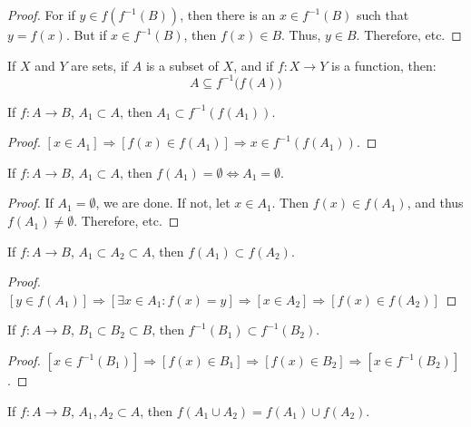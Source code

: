 \documentclass[crop=false,class=book,oneside]{standalone}
\begin{document}
        \begin{proof}
            For if $y\in{f(f^{-1}(B))}$, then there is an
            $x\in{f^{-1}(B)}$ such that $y=f(x)$. But if
            $x\in{f^{-1}(B)}$, then $f(x)\in{B}$. Thus,
            $y\in{B}$. Therefore, etc.
        \end{proof}
        \begin{theorem}
            If $X$ and $Y$ are sets, if $A$ is a subset of $X$,
            and if $f:X\rightarrow{Y}$ is a function, then:
            \begin{equation}
                A\subseteq{f^{-1}}\big(f(A)\big)
            \end{equation}
        \end{theorem}
        \begin{theorem}
        If $f:A\rightarrow B$, $A_1\subset A$, then $A_1\subset f^{-1}(f(A_1))$.
        \end{theorem}
        \begin{proof}
        $[x\in A_1]\Rightarrow [f(x) \in f(A_1)]\Rightarrow x\in f^{-1}(f(A_1))$.
        \end{proof}
        \begin{theorem}
        If $f:A\rightarrow B$, $A_1\subset A$, then $f(A_1) = \emptyset \Leftrightarrow A_1 = \emptyset$.
        \end{theorem}
        \begin{proof}
        If $A_1 = \emptyset$, we are done. If not, let $x\in A_1$. Then $f(x)\in f(A_1)$, and thus $f(A_1)\ne \emptyset$. Therefore, etc.
        \end{proof}
        \begin{corollary}
        If $f:A\rightarrow B$, $A_1\subset A_2\subset A$, then $f(A_1)\subset f(A_2)$.
        \end{corollary}
        \begin{proof}
        $[y\in f(A_1)]\Rightarrow[\exists x\in A_1:f(x)=y]\Rightarrow [x\in A_2] \Rightarrow [f(x)\in f(A_2)]$
        \end{proof}
        \begin{corollary}
        If $f:A\rightarrow B$, $B_1\subset B_2\subset B$, then $f^{-1}(B_1)\subset f^{-1}(B_2)$.
        \end{corollary}
        \begin{proof}
        $[x\in f^{-1}(B_1)] \Rightarrow [f(x) \in B_1] \Rightarrow [f(x) \in B_2]\Rightarrow [x\in f^{-1}(B_2)]$.
        \end{proof}
        \begin{theorem}
        If $f:A\rightarrow B$, $A_1,A_2\subset A$, then $f(A_1 \cup A_2) = f(A_1)\cup f(A_2)$.
        \end{theorem}
\end{document}
